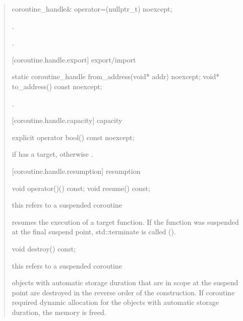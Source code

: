 \begin{quote}
\begin{itemdecl}
  coroutine_handle& operator=(nullptr_t) noexcept;
\end{itemdecl}
\begin{itemdescr}
	\pnum\postconditions {}.
  
  \pnum\returns {}.
\end{itemdescr}

[coroutine.handle.export]{ export/import}
\begin{itemdecl}
  static coroutine_handle from_address(void* addr) noexcept;		
  void* to_address() const noexcept;
\end{itemdecl}

\begin{itemdescr}
  \pnum
  \postconditions {}.
\end{itemdescr}

[coroutine.handle.capacity]{ capacity}
\begin{itemdecl}
  explicit operator bool() const noexcept;
\end{itemdecl}

\begin{itemdescr}
  \pnum
  \returns {} if  has a target, otherwise .
\end{itemdescr}

[coroutine.handle.resumption]{ resumption}
\begin{itemdecl}
  void operator()() const;
  void resume() const;	
\end{itemdecl}
\begin{itemdescr}
  \pnum
  \precondition *this refers to a suspended coroutine
  
  \pnum
  \effects resumes the execution of a target function. If the function was suspended
  at the final suspend point, std::terminate is called ().
\end{itemdescr}

\begin{itemdecl}
  void destroy() const;
\end{itemdecl}
\begin{itemdescr}
  \pnum
  \precondition *this refers to a suspended coroutine
  
  \pnum
  \effects objects with automatic storage duration that are in scope
  at the suspend point are destroyed in the reverse order of the construction. If coroutine required dynamic allocation
  for the objects with automatic storage duration, the memory
  is freed.
\end{itemdescr}


\end{quote}
